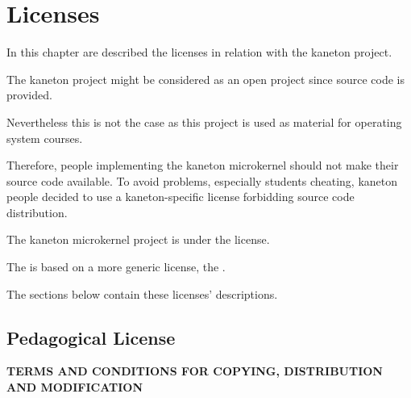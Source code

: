 %
%
%
%
%
%

%
%

\chapter{Licenses}
\label{chapter:licenses}

In this chapter are described the licenses in relation with the kaneton
project.

\newpage

%
%

The kaneton project might be considered as an open project since source
code is provided.

Nevertheless this is not the case as this project is used as material for
operating system courses.

Therefore, people implementing the kaneton microkernel should not
make their source code available. To avoid problems, especially students
cheating, kaneton people decided to use a kaneton-specific license
forbidding source code distribution.

The kaneton microkernel project is under the  license.

The  is based on a more generic license, the
.

The sections below contain these licenses' descriptions.

%
%

\section{Pedagogical License}
\label{section:pedagogical license}

\textbf{TERMS AND CONDITIONS FOR COPYING, DISTRIBUTION AND MODIFICATION}

